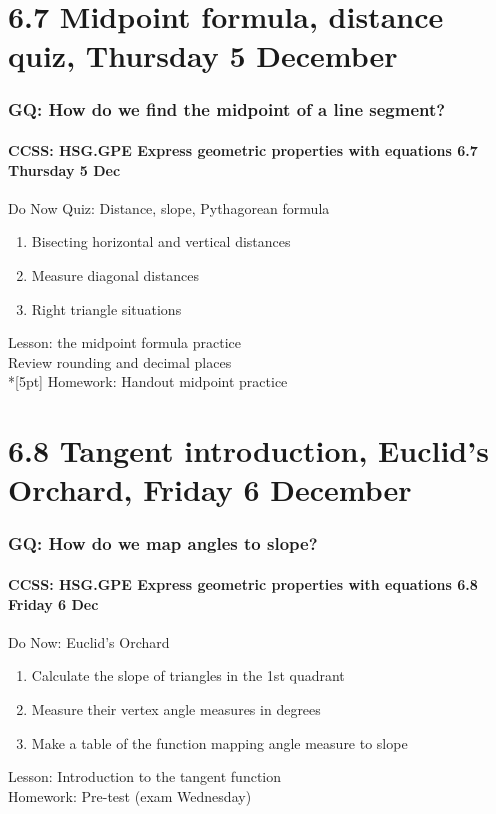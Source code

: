 \documentclass{beamer}
\begin{document}
  \section{6.7 Midpoint formula, distance quiz, Thursday 5 December}
  \frame
  {
    \frametitle{GQ: How do we find the midpoint of a line segment?}
    \framesubtitle{CCSS: HSG.GPE Express geometric properties with equations \hfill \alert{6.7 Thursday 5 Dec}}

    \begin{block}{Do Now Quiz: Distance, slope, Pythagorean formula}
    \begin{enumerate}
      \item Bisecting horizontal and vertical distances
      \item Measure diagonal distances
      \item Right triangle situations
    \end{enumerate}
    \end{block}
    Lesson: the midpoint formula practice\\
    Review rounding and decimal places \\*[5pt]
    Homework: Handout midpoint practice
  }

  \section{6.8 Tangent introduction, Euclid's Orchard, Friday 6 December}
  \frame
  {
    \frametitle{GQ: How do we map angles to slope?}
    \framesubtitle{CCSS: HSG.GPE Express geometric properties with equations \hfill \alert{6.8 Friday 6 Dec}}

    \begin{block}{Do Now: Euclid's Orchard}
    \begin{enumerate}
      \item Calculate the slope of triangles in the 1st quadrant
      \item Measure their vertex angle measures in degrees
      \item Make a table of the function mapping angle measure to slope
    \end{enumerate}
    \end{block}
    Lesson: Introduction to the tangent function \\
    Homework: Pre-test (\alert{exam Wednesday})
  }
\end{document}
